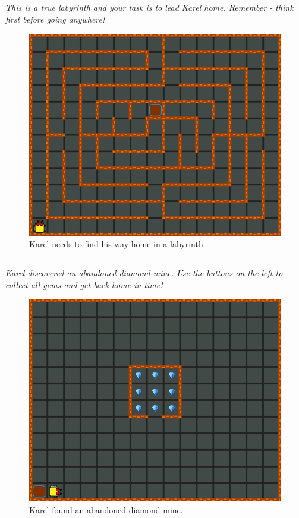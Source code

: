 \documentclass[article,A4,12pt]{llncs}
\begin{document}
\subsection{}

{\em This is a true labyrinth and your task is to lead Karel 
home. Remember - think first before going anywhere!}

\begin{figure}[!ht]
\begin{center}
\includegraphics[height=0.4\textwidth]{imgk/a10.png}
\end{center}
\vspace{-4mm}
\caption{Karel needs to find his way home in a labyrinth.}
\label{fig:a10}
\vspace{-4mm}
\end{figure}
\noindent


\subsection{}

{\em Karel discovered an abandoned diamond mine. Use the buttons
on the left to collect all gems and get back home in time!}

\begin{figure}[!ht]
\begin{center}
\includegraphics[height=0.4\textwidth]{imgk/a11.png}
\end{center}
\vspace{-4mm}
\caption{Karel found an abandoned diamond mine.}
\label{fig:a11}
\vspace{-10mm}
\end{figure}
\newpage
\noindent
\end{document}
